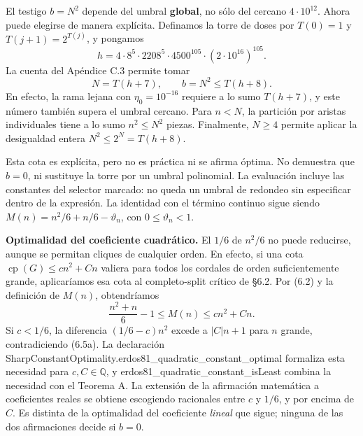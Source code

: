\documentclass[spanish,11pt,a4paper]{article}
\begin{document}
El testigo \(b=N^2\) depende del umbral \textbf{global}, no sólo del cercano \(4\cdot10^{12}\). Ahora puede elegirse de manera explícita. Definamos la torre de doses por \(T(0)=1\) y \(T(j+1)=2^{T(j)}\), y pongamos \[
h=4\cdot8^5\cdot2208^5\cdot4500^{105}\cdot(2\cdot10^{16})^{105}.
\] La cuenta del Apéndice C.3 permite tomar \[
N=T(h+7),\qquad b=N^2\le T(h+8).
\] En efecto, la rama lejana con \(\eta_0=10^{-16}\) requiere a lo sumo \(T(h+7)\), y este número también supera el umbral cercano. Para \(n<N\), la partición por aristas individuales tiene a lo sumo \(n^2\le N^2\) piezas. Finalmente, \(N\ge4\) permite aplicar la desigualdad entera \(N^2\le2^N=T(h+8)\).

Esta cota es explícita, pero no es práctica ni se afirma óptima. No demuestra que \(b=0\), ni sustituye la torre por un umbral polinomial. La evaluación incluye las constantes del selector marcado: no queda un umbral de redondeo sin especificar dentro de la expresión. La identidad con el término continuo sigue siendo \(M(n)=n^2/6+n/6-\vartheta_n\), con \(0\le\vartheta_n<1\).

\textbf{Optimalidad del coeficiente cuadrático.} El \(1/6\) de \(n^2/6\) no puede reducirse, aunque se permitan cliques de cualquier orden. En efecto, si una cota \(\operatorname{cp}(G)\le c n^2+C n\) valiera para todos los cordales de orden suficientemente grande, aplicaríamos esa cota al completo-split crítico de §6.2. Por (6.2) y la definición de \(M(n)\), obtendríamos \[
\frac{n^2+n}{6}-1\le M(n)\le cn^2+Cn.
\tag{6.5a}
\] Si \(c<1/6\), la diferencia \((1/6-c)n^2\) excede a \(|C|n+1\) para \(n\) grande, contradiciendo (6.5a). La declaración {\ttfamily\small SharpConstan\discretionary{\hbox{\ensuremath{\hookrightarrow}}}{}{}tOptimality.\discretionary{\hbox{\ensuremath{\hookrightarrow}}}{}{}erdos81\_\discretionary{\hbox{\ensuremath{\hookrightarrow}}}{}{}quadratic\_\discretionary{\hbox{\ensuremath{\hookrightarrow}}}{}{}constant\_\discretionary{\hbox{\ensuremath{\hookrightarrow}}}{}{}optimal} formaliza esta necesidad para \(c,C\in\mathbb Q\), y {\ttfamily\small erdos81\_\discretionary{\hbox{\ensuremath{\hookrightarrow}}}{}{}quadratic\_\discretionary{\hbox{\ensuremath{\hookrightarrow}}}{}{}constant\_\discretionary{\hbox{\ensuremath{\hookrightarrow}}}{}{}isLeast} combina la necesidad con el Teorema A. La extensión de la afirmación matemática a coeficientes reales se obtiene escogiendo racionales entre \(c\) y \(1/6\), y por encima de \(C\). Es distinta de la optimalidad del coeficiente \emph{lineal} que sigue; ninguna de las dos afirmaciones decide si \(b=0\).
\end{document}
